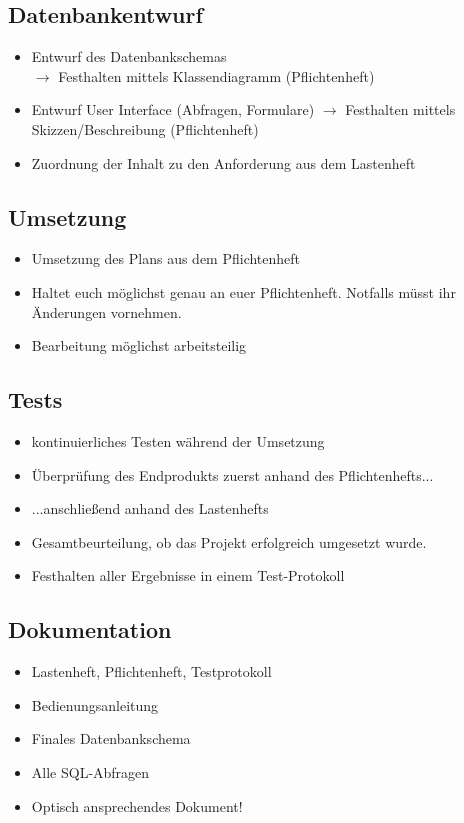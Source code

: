 \subsection{Datenbankentwurf}
\begin{itemize}
    \item Entwurf des Datenbankschemas\\
    $\rightarrow$ Festhalten mittels Klassendiagramm (Pflichtenheft)
    \item Entwurf User Interface (Abfragen, Formulare)
    $\rightarrow$ Festhalten mittels Skizzen/Beschreibung (Pflichtenheft)\\
    \item Zuordnung der Inhalt zu den Anforderung aus dem Lastenheft
\end{itemize}

\subsection{Umsetzung}
\begin{itemize}
    \item Umsetzung des Plans aus dem Pflichtenheft
    \item Haltet euch möglichst genau an euer Pflichtenheft. Notfalls müsst ihr Änderungen vornehmen.
    \item Bearbeitung möglichst arbeitsteilig
\end{itemize}

\subsection{Tests}
\begin{itemize}
    \item kontinuierliches Testen während der Umsetzung
    \item Überprüfung des Endprodukts zuerst anhand des Pflichtenhefts...
    \item ...anschließend anhand des Lastenhefts
    \item Gesamtbeurteilung, ob das Projekt erfolgreich umgesetzt wurde.
    \item Festhalten aller Ergebnisse in einem Test-Protokoll 
\end{itemize}

\subsection{Dokumentation}
\begin{itemize}
    \item Lastenheft, Pflichtenheft, Testprotokoll
    \item Bedienungsanleitung
    \item Finales Datenbankschema
    \item Alle SQL-Abfragen
    \item Optisch ansprechendes Dokument!
\end{itemize}

